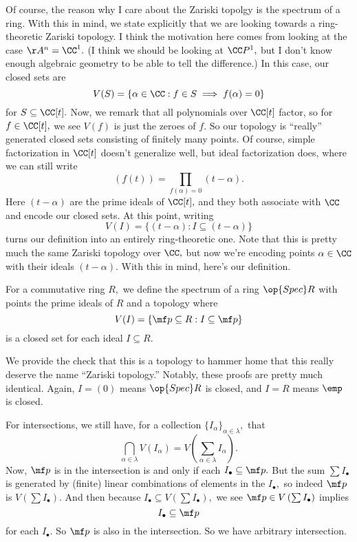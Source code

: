 Of course, the reason why I care about the Zariski topolgy is the spectrum of a ring. With this in mind, we state explicitly that we are looking towards a ring-theoretic Zariski topology. I think the motivation here comes from looking at the case $\AA^n=\CC^1.$ (I think we should be looking at $\CC P^1,$ but I don't know enough algebraic geometry to be able to tell the difference.) In this case, our closed sets are
\[V(S)=\{\alpha\in\CC:f\in S\implies f(\alpha)=0\}\]
for $S\subseteq\CC[t].$ Now, we remark that all polynomials over $\CC[t]$ factor, so for $f\in\CC[t],$ we see $V(f)$ is just the zeroes of $f.$ So our topology is ``really'' generated closed sets consisting of finitely many points. Of course, simple factorization in $\CC[t]$ doesn't generalize well, but ideal factorization does, where we can still write
\[(f(t))=\prod_{f(\alpha)=0}(t-\alpha).\]
Here $(t-\alpha)$ are the prime ideals of $\CC[t],$ and they both associate with $\CC$ and encode our closed sets. At this point, writing
\[V(I)=\{(t-\alpha):I\subseteq(t-\alpha)\}\]
turns our definition into an entirely ring-theoretic one. Note that this is pretty much the same Zariski topology over $\CC,$ but now we're encoding points $\alpha\in\CC$ with their ideals $(t-\alpha).$ With this in mind, here's our definition.
\begin{definition}
    For a commutative ring $R,$ we define the spectrum of a ring $\op{Spec}R$ with points the prime ideals of $R$ and a topology where
    \[V(I)=\{\mf p\subseteq R:I\subseteq\mf p\}\]
    is a closed set for each ideal $I\subseteq R.$
\end{definition}
We provide the check that this is a topology to hammer home that this really deserve the name ``Zariski topology.'' Notably, these proofs are pretty much identical. Again, $I=(0)$ means $\op{Spec}R$ is closed, and $I=R$ means $\emp$ is closed.

For intersections, we still have, for a collection $\{I_\alpha\}_{\alpha\in\lambda},$ that
\[\bigcap_{\alpha\in\lambda}V(I_\alpha)=V\left(\sum_{\alpha\in\lambda}I_\alpha\right).\]
Now, $\mf p$ is in the intersection is and only if each $I_\bullet\subseteq\mf p.$ But the sum $\sum I_\bullet$ is generated by (finite) linear combinations of elements in the $I_\bullet,$ so indeed $\mf p$ is $V\left(\sum I_\bullet\right).$ And then because $I_\bullet\subseteq V\left(\sum I_\bullet\right),$ we see $\mf p\in V\left(\sum I_\bullet\right)$ implies
\[I_\bullet\subseteq\mf p\]
for each $I_\bullet.$ So $\mf p$ is also in the intersection. So we have arbitrary intersection.

